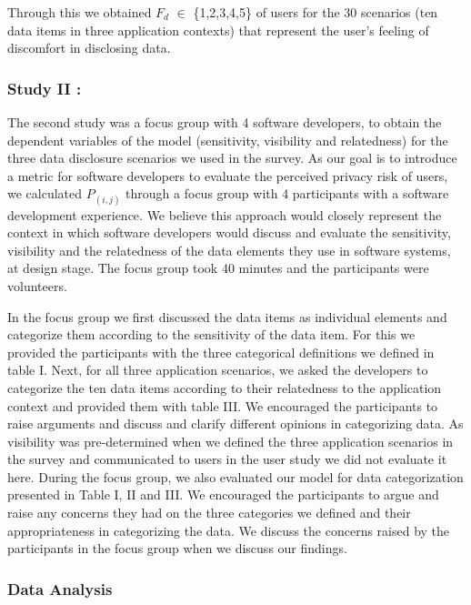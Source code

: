 \documentclass[10pt]{article}
\begin{document}
Through this we obtained $F_d$ $\in$ \{1,2,3,4,5\} of users for the 30 scenarios (ten data items in three application contexts) that represent the user's feeling of discomfort in disclosing data.

\subsubsection{Study II : }

 The second study was a focus group with 4 software developers, to obtain the dependent variables of the model (sensitivity, visibility and relatedness) for the three data disclosure scenarios we used in the survey. As our goal is to introduce a metric for software developers to evaluate the perceived privacy risk of users, we calculated $P_{(i,j)}$ through a focus group with 4 participants with a software development experience. We believe this approach would closely represent the context in which software developers would discuss and evaluate the sensitivity, visibility and the relatedness of the data elements they use in software systems, at design stage. The focus group took 40 minutes and the participants were volunteers.

In the focus group we first discussed the data items as individual elements and categorize them according to the sensitivity of the data item. For this we provided the participants with the three categorical definitions we defined in table I. Next, for all three application scenarios, we asked the developers to categorize the ten data items according to their relatedness to the application context and provided them with table III. We encouraged the participants to raise arguments and discuss and clarify different opinions in categorizing data. As visibility was pre-determined when we defined the three application scenarios in the survey and communicated to users in the user study we did not evaluate it here. During the focus group, we also evaluated our model for data categorization presented in  Table I, II and III. We encouraged the participants to argue and raise any concerns they had on the three categories we defined and their appropriateness in categorizing the data. We discuss the concerns raised by the participants in the focus group when we discuss our findings. 

\subsubsection{Data Analysis}
\end{document}
